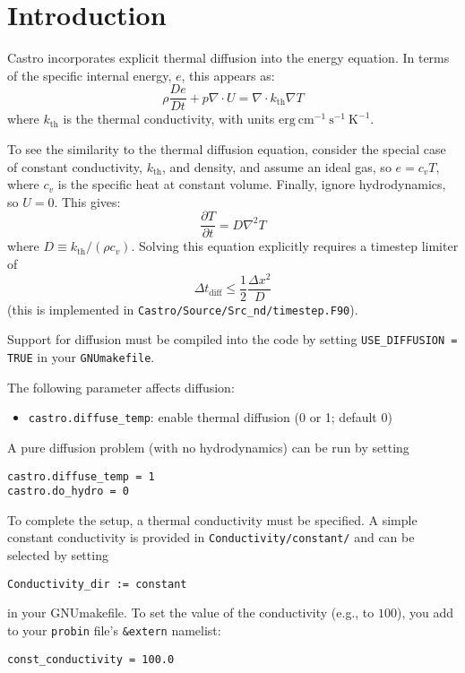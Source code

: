 \section{Introduction}

Castro incorporates explicit thermal diffusion into the energy equation.  
In terms of the specific internal energy, $e$, this appears as:
\begin{equation}
\rho \frac{De}{Dt} + p \nabla \cdot U = \nabla \cdot k_\mathrm{th} \nabla T
\end{equation}
where $k_\mathrm{th}$ is the thermal conductivity, with units
$\mathrm{erg~cm^{-1}~s^{-1}~K^{-1}}$.

To see the similarity to the thermal diffusion equation, consider the special
case of constant conductivity, $k_\mathrm{th}$, and density, and assume an
ideal gas, so $e = c_v T$, where $c_v$ is the specific heat at constant volume.
Finally, ignore hydrodynamics, so $U = 0$.  This gives:
\begin{equation}
\frac{\partial T}{\partial t} = D \nabla^2 T
\end{equation}
where $D \equiv k_\mathrm{th}/(\rho c_v)$.  Solving this equation
explicitly requires a timestep limiter of
\begin{equation}
\Delta t_\mathrm{diff} \le \frac{1}{2} \frac{\Delta x^2}{D}
\end{equation}
(this is implemented in {\tt Castro/Source/Src\_nd/timestep.F90}).

Support for diffusion must be compiled into the code by setting
{\tt USE\_DIFFUSION = TRUE} in your {\tt GNUmakefile}.


The following parameter affects diffusion:
\begin{itemize}
\item {\tt castro.diffuse\_temp}:  enable thermal diffusion (0 or 1; default 0)
\end{itemize}

A pure diffusion problem (with no hydrodynamics) can be run by setting
\begin{verbatim}
castro.diffuse_temp = 1
castro.do_hydro = 0
\end{verbatim}

To complete the setup, a thermal conductivity must be specified.
A simple constant conductivity is provided in {\tt Conductivity/constant/}
and can be selected by setting
\begin{verbatim}
Conductivity_dir := constant
\end{verbatim}
in your GNUmakefile.  To set the value of the conductivity (e.g., to
$100$), you add to your {\tt probin} file's {\tt \&extern} namelist:
\begin{verbatim}
const_conductivity = 100.0
\end{verbatim}


